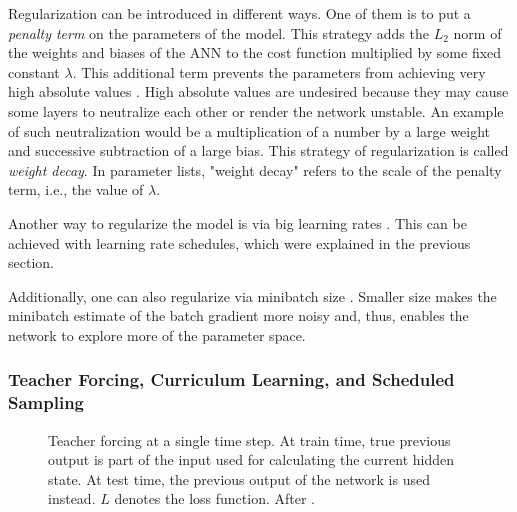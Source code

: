 Regularization can be introduced in different ways. One of them is to put a \emph{penalty term} on the parameters of the model. This strategy adds the $L_2$ norm of the weights and biases of the \ac{ANN} to the cost function multiplied by some fixed constant $\lambda$. This additional term prevents the parameters from achieving very high absolute values \cite{Goodfellow-et-al-2016}. High absolute values are undesired because they may cause some layers to neutralize each other or render the network unstable. An example of such neutralization would be a multiplication of a number by a large weight and successive subtraction of a large bias. This strategy of regularization is called \emph{weight decay}. In parameter lists, "weight decay" refers to the scale of the penalty term, i.e., the value of $\lambda$.

Another way to regularize the model is via big learning rates \cite{Smith2018}. This can be achieved with learning rate schedules, which were explained in the previous section.

Additionally, one can also regularize via minibatch size \cite{Bengio2012}. Smaller size makes the minibatch estimate of the batch gradient more noisy and, thus, enables the network to explore more of the parameter space.

\subsubsection{Teacher Forcing, Curriculum Learning, and Scheduled Sampling}
\label{subsec:teacher_forcing}

\begin{figure}
    \centering
    \scalebox{0.6}{}
    \caption{Teacher forcing at a single time step. At train time, true previous output is part of the input used for calculating the current hidden state. At test time, the previous output of the network is used instead. $L$ denotes the loss function. After \cite{Goodfellow-et-al-2016}.}
    \label{fig:teacher_forcing}
\end{figure}

